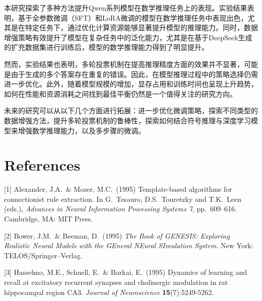 \documentclass{article}
\begin{document}
本研究探索了多种方法提升Qwen系列模型在数学推理任务上的表现。实验结果表明，基于全参数微调（SFT）和LoRA微调的模型在数学推理任务中表现出色，尤其是在特定任务下，通过优化计算资源能够显著提升模型的推理能力。同时，数据增强策略有效提升了模型在复杂任务中的泛化能力，尤其是在基于DeepSeek生成的扩充数据集进行训练后，模型的数学推理能力得到了明显提升。

然而，实验结果也表明，多轮投票机制在提高推理精度方面的效果并不显著，可能是由于生成的多个答案存在重复的错误。因此，在模型推理过程中的策略选择仍需进一步优化。此外，随着模型规模的增加，显存占用和训练时间也呈现上升趋势，如何在性能和资源消耗之间找到最佳平衡仍然是一个值得关注的研究方向。

未来的研究可以从以下几个方面进行拓展：进一步优化微调策略，探索不同类型的数据增强方法，提升多轮投票机制的鲁棒性，探索如何结合符号推理与深度学习模型来增强数学推理能力，以及多步骤的微调。




\section{References}


{
\small


[1] Alexander, J.A.\ \& Mozer, M.C.\ (1995) Template-based algorithms for
connectionist rule extraction. In G.\ Tesauro, D.S.\ Touretzky and T.K.\ Leen
(eds.), {\it Advances in Neural Information Processing Systems 7},
pp.\ 609--616. Cambridge, MA: MIT Press.


[2] Bower, J.M.\ \& Beeman, D.\ (1995) {\it The Book of GENESIS: Exploring
  Realistic Neural Models with the GEneral NEural SImulation System.}  New York:
TELOS/Springer--Verlag.


[3] Hasselmo, M.E., Schnell, E.\ \& Barkai, E.\ (1995) Dynamics of learning and
recall at excitatory recurrent synapses and cholinergic modulation in rat
hippocampal region CA3. {\it Journal of Neuroscience} {\bf 15}(7):5249-5262.
}
\end{document}
